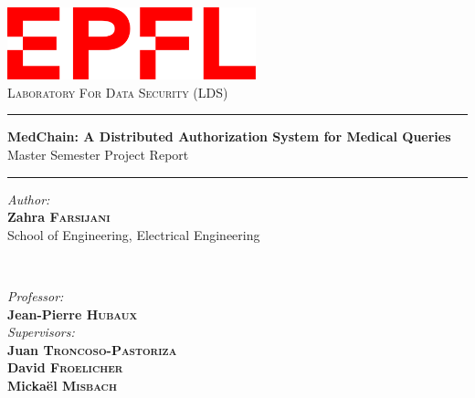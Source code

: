 \documentclass[12pt]{article}
\begin{document}
\begin{titlepage}
\center
\includegraphics[width=7.2cm]{Images/EPFL_Logo_SVG.png}\vspace{23pt}\\
\textsc{\Large Laboratory For Data Security (LDS)}\\[0.5cm]

\vspace{25pt}
\hrule
\vspace{0.4cm}
{\Large \bfseries MedChain: A Distributed Authorization System for Medical Queries }\\[0.5cm] %
\normalsize{Master Semester Project Report}
\vspace{0.4cm}
\hrule 
\vspace{1.5cm}
\begin{minipage}{0.5\textwidth}\large
\begin{flushleft}
\emph{Author:}\\
\textbf{Zahra \textsc{Farsijani}}\\
School of Engineering, Electrical Engineering
\end{flushleft}
\end{minipage}
~
\begin{minipage}{0.4\textwidth}
\begin{flushright} \large
\emph{Professor:} \\
\textbf{Jean-Pierre \textsc{Hubaux}}\\
\emph{Supervisors:} \\
\textbf{Juan \textsc{Troncoso-Pastoriza} }\\
\textbf{David \textsc{Froelicher}}\\
\textbf{Mickaël \textsc{Misbach}}


\end{flushright}
\end{minipage}
\end{titlepage}
\end{document}
